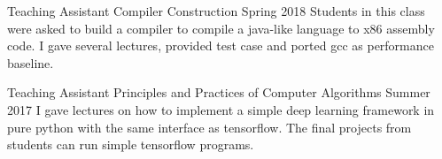 

\begin{cventries}

  \cventry
    {Teaching Assistant} %
    {Compiler Construction} %
    {Spring 2018} %
    {} %
    {Students in this class were asked to build a compiler to compile a java-like language to x86 assembly code. \quad \quad
     I gave several lectures, provided test case and ported gcc as performance baseline.}

  \cventry
	{Teaching Assistant} %
	{Principles and Practices of Computer Algorithms} %
	{Summer 2017} %
	{} %
	{I gave lectures on how to implement a simple deep learning framework in pure python with the same interface as tensorflow. The final projects from students can run simple tensorflow programs.}




\end{cventries}

